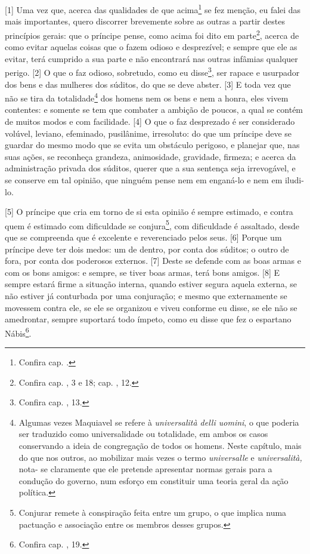 {[}1{]} Uma vez que, acerca das qualidades de que acima\footnote{Confira
  cap. .} se fez menção, eu falei das mais importantes, quero
discorrer brevemente sobre as outras a partir destes princípios gerais:
que o príncipe pense, como acima foi dito em parte\footnote{Confira cap.
  , 3 e 18; cap. , 12.}, acerca de como evitar aquelas coisas que
o fazem odioso e desprezível; e sempre que ele as evitar, terá cumprido
a sua parte e não encontrará nas outras infâmias qualquer perigo.
{[}2{]} O que o faz odioso, sobretudo, como eu disse\footnote{Confira
  cap. , 13.}, ser rapace e usurpador dos bens e das mulheres dos
súditos, do que se deve abster. {[}3{]} E toda vez que não se tira da
totalidade\footnote{Algumas vezes Maquiavel se refere à
  \emph{universalità delli uomini}, o que poderia ser traduzido como
  universalidade ou totalidade, em ambos os casos conservando a ideia de
  congregação de todos os homens. Neste capítulo, mais do que nos
  outros, ao mobilizar mais vezes o termo \emph{universalle} e
  \emph{universalità,} nota- se claramente que ele pretende apresentar
  normas gerais para a condução do governo, num esforço em constituir
  uma teoria geral da ação política.} dos homens nem os bens e nem a
honra, eles vivem contentes: e somente se tem que combater a ambição de
poucos, a qual se contém de muitos modos e com facilidade. {[}4{]} O que
o faz desprezado é ser considerado volúvel, leviano, efeminado,
pusilânime, irresoluto: do que um príncipe deve se guardar do mesmo modo
que se evita um obstáculo perigoso, e planejar que, nas suas ações, se
reconheça grandeza, animosidade, gravidade, firmeza; e acerca da
administração privada dos súditos, querer que a sua sentença seja
irrevogável, e se conserve em tal opinião, que ninguém pense nem em
enganá-lo e nem em iludi-lo.

{[}5{]} O príncipe que cria em torno de si esta opinião é sempre
estimado, e contra quem é estimado com dificuldade se conjura\footnote{Conjurar
  remete à conspiração feita entre um grupo, o que implica numa
  pactuação e associação entre os membros desses grupos.}, com
dificuldade é assaltado, desde que se compreenda que é excelente e
reverenciado pelos seus. {[}6{]} Porque um príncipe deve ter dois medos:
um de dentro, por conta dos súditos; o outro de fora, por conta dos
poderosos externos. {[}7{]} Deste se defende com as boas armas e com os
bons amigos: e sempre, se tiver boas armas, terá bons amigos. {[}8{]} E
sempre estará firme a situação interna, quando estiver segura aquela
externa, se não estiver já conturbada por uma conjuração; e mesmo que
externamente se movessem contra ele, se ele se organizou e viveu
conforme eu disse, se ele não se amedrontar, sempre suportará todo
ímpeto, como eu disse que fez o espartano Nábis\footnote{Confira cap.
  , 19.}.

